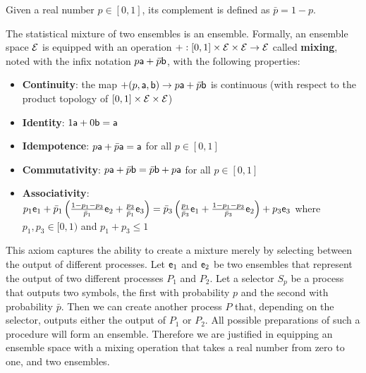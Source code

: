 \begin{mathSection}
\begin{defn}
	Given a real number $p \in [0,1]$, its complement is defined as $\bar{p} = 1-p$.
\end{defn}

\begin{axiom}\label{pm_es_axiomMixture}
	The statistical mixture of two ensembles is an ensemble. Formally, an ensemble space $\Ens$ is equipped with an operation $+ : [0, 1] \times \Ens \times \Ens \to \Ens$ called \textbf{mixing}, noted with the infix notation $p \ens[a] + \bar{p} \ens[b]$, with the following properties:
	\begin{itemize}
		\item \textbf{Continuity}: the map $+(p, \ens[a], \ens[b])  \to p \ens[a] + \bar{p} \ens[b]$ is continuous (with respect to the product topology of $[0, 1] \times \Ens \times \Ens$)
		\item \textbf{Identity}: $1 \ens[a] + 0 \ens[b] = \ens[a]$
		\item \textbf{Idempotence}:  $p \ens[a] + \bar{p} \ens[a] = \ens[a]$ for all $p \in [0,1]$
		\item \textbf{Commutativity}: $p \ens[a] + \bar{p} \ens[b] = \bar{p} \ens[b] + p \ens[a]$ for all $p \in [0,1]$
		\item \textbf{Associativity}: $p_1 \ens_1 + \bar{p}_1\left(\frac{1-p_1-p_3}{\bar{p}_1}\ens_2 + \frac{p_3}{\bar{p}_1}\ens_3\right) =  \bar{p}_3\left(\frac{p_1}{\bar{p}_3} \ens_1 +  \frac{1-p_1-p_3}{\bar{p}_3}\ens_2\right) + p_3 \ens_3$ where $p_1, p_3 \in [0,1)$ and $p_1 + p_3 \leq 1$
	\end{itemize}
\end{axiom}

\begin{justification}
	This axiom captures the ability to create a mixture merely by selecting between the output of different processes. Let $\ens_1$ and $\ens_2$ be two ensembles that represent the output of two different processes $P_1$ and $P_2$. Let a selector $S_p$ be a process that outputs two symbols, the first with probability $p$ and the second with probability $\bar{p}$. Then we can create another process $P$ that, depending on the selector, outputs either the output of $P_1$ or $P_2$. All possible preparations of such a procedure will form an ensemble. Therefore we are justified in equipping an ensemble space with a mixing operation that takes a real number from zero to one, and two ensembles.
	

\end{justification}
\end{mathSection}
